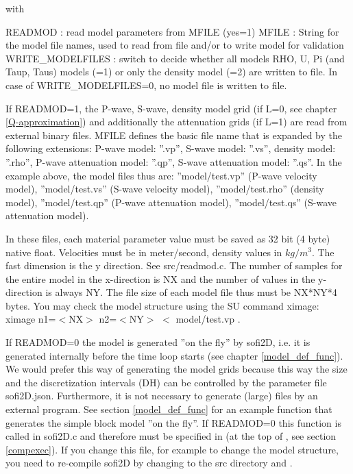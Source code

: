 \documentclass[11pt,onecolumn,oneside]{article}
\begin{document}
with

READMOD : read model parameters from MFILE (yes=1)\newline
MFILE : String for the model file names, used to read from file and/or to write model for validation \newline
WRITE\_MODELFILES : switch to decide whether all models RHO, U, Pi (and Taup, Taus) models (=1) or only the density model (=2) are written to file. In case of WRITE\_MODELFILES=0, no model file is written to file. \newline

If READMOD=1, the P-wave, S-wave, density model grid (if L=0, see chapter \ref{Q-approximation}) and additionally the attenuation grids (if L=1) are read from external binary files. MFILE defines the basic file name that is expanded by the following extensions: P-wave model: ''.vp'', S-wave model: ''.vs'', density model: ''.rho'', P-wave attenuation model: ''.qp'', S-wave attenuation model: ''.qs''.  In the example above, the model files thus are: ''model/test.vp'' (P-wave velocity model), ''model/test.vs'' (S-wave velocity model), ''model/test.rho'' (density model), ''model/test.qp'' (P-wave attenuation model), ''model/test.qs'' (S-wave attenuation model). 

In these files, each material parameter value must be saved as 32 bit (4 byte) native float. Velocities must be in meter/second, density values in $kg/m^3$. The fast dimension is the y direction. See src/readmod.c. The number of samples for the entire model in the x-direction is NX and the number of values in the y-direction is always NY. The file size of each model file thus must be NX*NY*4 bytes. You may check the model structure using the SU command ximage: ximage n1=$<$NX$>$ n2=$<$NY$>$ $<$ model/test.vp .

If READMOD=0 the model is generated ''on the fly'' by sofi2D, i.e. it is generated internally before the time loop starts (see chapter \ref{model_def_func}). We would prefer this way of generating the model grids because this way the size and the discretization intervals (DH) can be controlled by the parameter file sofi2D.json. Furthermore, it is not necessary to generate (large) files by an external program. See section \ref{model_def_func} for an example function that generates the simple block model ''on the fly''. If READMOD=0 this function is called in sofi2D.c and therefore must be specified in  (at the top of , see section \ref{compexec}). If you change this file, for example to change the model structure, you need to re-compile sofi2D by changing to the src directory and .
\end{document}
